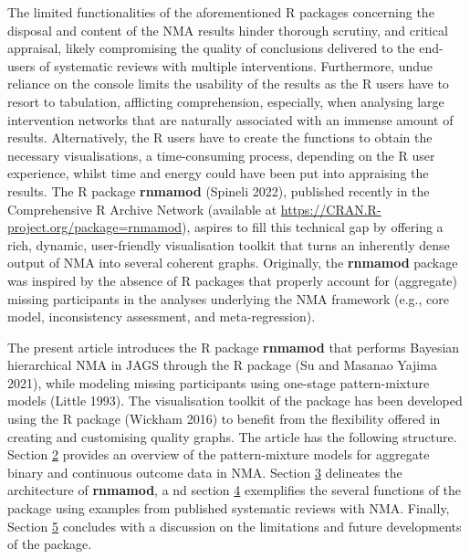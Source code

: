 The limited functionalities of the aforementioned R packages concerning the disposal
and content of the NMA results hinder thorough scrutiny, and critical appraisal,
likely compromising the quality of conclusions delivered to the end-users of
systematic reviews with multiple interventions. Furthermore, undue reliance on the
console limits the usability of the results as the R users have to resort to tabulation,
afflicting comprehension, especially, when analysing large intervention networks
that are naturally associated with an immense amount of results. Alternatively,
the R users have to create the functions to obtain the necessary visualisations,
a time-consuming process, depending on the R user experience, whilst time and
energy could have been put into appraising the results. The R package \textbf{rnmamod}
(Spineli 2022), published recently in the Comprehensive R Archive Network (available
at \url{https://CRAN.R-project.org/package=rnmamod}),
aspires to fill this technical gap by offering a rich, dynamic, user-friendly
visualisation toolkit that turns an inherently dense output of NMA into several
coherent graphs. Originally, the \textbf{rnmamod} package was inspired by the absence of
R packages that properly account for (aggregate) missing participants in the analyses
underlying the NMA framework (e.g., core model, inconsistency assessment, and
meta-regression).

The present article introduces the R package \textbf{rnmamod} that performs Bayesian
hierarchical NMA in JAGS through the R package  (Su and Masanao Yajima 2021),
while modeling missing participants using one-stage pattern-mixture models (Little 1993).
The visualisation toolkit of the package has been developed using the R package
 (Wickham 2016) to benefit from the flexibility offered in creating
and customising quality graphs. The article has the following structure. Section
\protect\hyperlink{Pattern-mixture-models-for-aggregate-binary-and-continuous-outcomes}{2} provides
an overview of the pattern-mixture models for aggregate binary and continuous
outcome data in NMA. Section \protect\hyperlink{X}{3} delineates the architecture of \textbf{rnmamod}, a
nd section \protect\hyperlink{X}{4} exemplifies the several functions of the package using examples
from published systematic reviews with NMA. Finally, Section \protect\hyperlink{X}{5} concludes
with a discussion on the limitations and future developments of the package.

